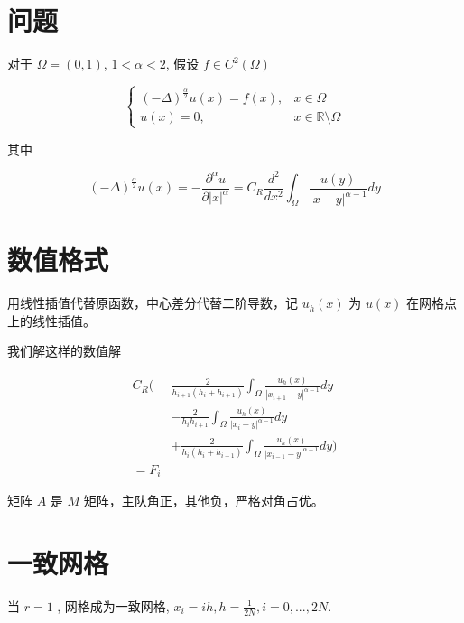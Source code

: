 \documentclass{ctexart}
\begin{document}
\section{问题}

对于 \(\Omega=(0,1)\), \(1<\alpha<2\), 假设 \(f\in C^2(\Omega)\)

\begin{equation}
    \begin{cases}
        (-\Delta)^{\frac{\alpha}{2}} u(x) = f(x),    & x \in \Omega  \\
        u(x) = 0,   & x \in \mathbb{R} \setminus \Omega
    \end{cases}
\end{equation}

其中

\begin{equation}
    (-\Delta)^{\frac{\alpha}{2}} u(x) = -\frac{\partial^\alpha u}{\partial |x|^\alpha} 
    = C_R \frac{d^2}{dx^2} \int_\Omega \frac{u(y)}{|x-y|^{\alpha-1}} dy
\end{equation}


\section{数值格式}

用线性插值代替原函数，中心差分代替二阶导数，记 \(u_h(x)\) 为 \(u(x)\) 在网格点上的线性插值。

我们解这样的数值解

\begin{equation}
    \begin{aligned}
        C_R ( & \frac{2}{h_{i+1} (h_i + h_{i+1})}\int_\Omega \frac{u_h(x)}{ |x_{i+1}-y|^{\alpha-1} } dy \\
                & -\frac{2}{h_i h_{i+1}}\int_\Omega \frac{u_h(x)}{ |x_i-y|^{\alpha-1} } dy \\
                & + \frac{2}{h_i (h_i+ h_{i+1})}\int_\Omega \frac{u_h(x)}{ |x_{i-1}-y|^{\alpha-1} } dy
            ) \\
        = F_i
    \end{aligned}
\end{equation}


矩阵 \(A\) 是 \(M\) 矩阵，主队角正，其他负，严格对角占优。


\section{一致网格}

当 \(r=1\) , 网格成为一致网格, \(x_i = ih, h=\frac{1}{2N}, i=0, ..., 2N\).
\end{document}
